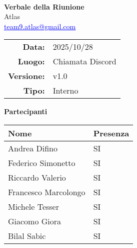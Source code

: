\documentclass[a4paper,12pt]{article}
\makeatletter
\newcommand{\Gruppo}{Atlas}
\newcommand{\Email}{\href{mailto:team9.atlas@gmail.com}{\textcolor{blue}{\underline{team9.atlas@gmail.com}}}}
\newcommand{\TitoloVerbale}{Verbale della Riunione}
\newcommand{\DataVerbale}{2025/10/28}
\newcommand{\LuogoVerbale}{Chiamata Discord}
\newcommand{\LogoGruppo}{img/AtlasLogo.png} %
\newcommand{\VersioneVerbale}{v1.0} %
\newcommand{\VerbaleInterno}{Interno}
\makeatother
\begin{document}
\begin{titlepage}
    \centering

    \vspace*{0cm}
    \\
    [.5cm]
    {\Huge \textbf{\TitoloVerbale}}\\[0.8cm]
    {\LARGE \Gruppo}\\[0.1cm]
    {\Email}\\[1.2cm]

    \begin{tabular}{rl}
        \textbf{Data:} & \DataVerbale \\
        \textbf{Luogo:} & \LuogoVerbale \\
        \textbf{Versione:} & \VersioneVerbale \\
        \textbf{Tipo:} & \VerbaleInterno \\
    \end{tabular}

    \vspace{1.2cm}

    {\large \textbf{Partecipanti}}\\[0.5cm]
    \begin{tabular}{l|l}
        \textbf{Nome} & \textbf{Presenza} \\
        \hline
        Andrea Difino & SI \\
        Federico Simonetto & SI \\
        Riccardo Valerio & SI \\
        Francesco Marcolongo & SI \\
        Michele Tesser & SI \\
        Giacomo Giora & SI \\
        Bilal Sabic & SI \\
    \end{tabular}

\end{titlepage}
\end{document}
